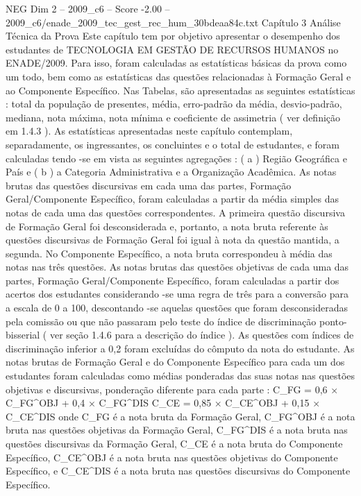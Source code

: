 \begin{textsample}{NEG Dim 2 – 2009\_c6 – Score -2.00 – 2009\_c6/enade\_2009\_tec\_gest\_rec\_hum\_30bdeaa84c.txt}  \label{ex:f2_neg_135}
Capítulo 3 Análise Técnica da Prova Este capítulo tem por objetivo apresentar o desempenho dos estudantes de TECNOLOGIA EM GESTÃO DE RECURSOS HUMANOS no ENADE/2009.
Para isso, foram calculadas as estatísticas básicas da prova como um todo, bem como as estatísticas das questões relacionadas à Formação Geral e ao Componente Específico.
Nas Tabelas, são apresentadas as seguintes estatísticas : total da população de presentes, média, erro-padrão da média, desvio-padrão, mediana, nota máxima, nota mínima e coeficiente de assimetria ( ver definição em 1.4.3 ).
As estatísticas apresentadas neste capítulo contemplam, separadamente, os ingressantes, os concluintes e o total de estudantes, e foram calculadas tendo -se em vista as seguintes agregações : ( a ) Região Geográfica e País e ( b ) a Categoria Administrativa e a Organização Acadêmica.
As notas brutas das questões discursivas em cada uma das partes, Formação Geral/Componente Específico, foram calculadas a partir da média simples das notas de cada uma das questões correspondentes.
A primeira questão discursiva de Formação Geral foi desconsiderada e, portanto, a nota bruta referente às questões discursivas de Formação Geral foi igual à nota da questão mantida, a segunda.
No Componente Específico, a nota bruta correspondeu à média das notas nas três questões.
As notas brutas das questões objetivas de cada uma das partes, Formação Geral/Componente Específico, foram calculadas a partir dos acertos dos estudantes considerando -se uma regra de três para a conversão para a escala de 0 a 100, descontando -se aquelas questões que foram desconsideradas pela comissão ou que não passaram pelo teste do índice de discriminação ponto-bisserial ( ver seção 1.4.6 para a descrição do índice ).
As questões com índices de discriminação inferior a 0,2 foram excluídas do cômputo da nota do estudante.
As notas brutas de Formação Geral e do Componente Específico para cada um dos estudantes foram calculadas como médias ponderadas das suas notas nas questões objetivas e discursivas, ponderação diferente para cada parte : C\_FG = 0,6 × C\_FG\textasciicircum{}OBJ + 0,4 × C\_FG\textasciicircum{}DIS C\_CE = 0,85 × C\_CE\textasciicircum{}OBJ + 0,15 × C\_CE\textasciicircum{}DIS onde C\_FG é a nota bruta da Formação Geral, C\_FG\textasciicircum{}OBJ é a nota bruta nas questões objetivas da Formação Geral, C\_FG\textasciicircum{}DIS é a nota bruta nas questões discursivas da Formação Geral, C\_CE é a nota bruta do Componente Específico, C\_CE\textasciicircum{}OBJ é a nota bruta nas questões objetivas do Componente Específico, e C\_CE\textasciicircum{}DIS é a nota bruta nas questões discursivas do Componente Específico.

\end{textsample}
